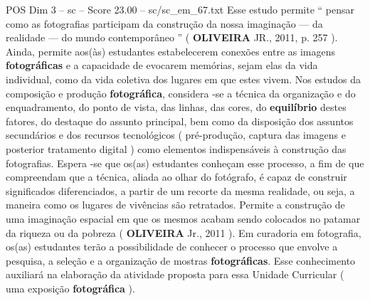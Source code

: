 \begin{textsample}{POS Dim 3 – sc – Score 23.00 – sc/sc\_em\_67.txt}
Esse estudo permite “ pensar como as fotografias participam da construção da nossa imaginação — da realidade — do mundo contemporâneo ” ( \textbf{OLIVEIRA} JR., 2011, p. 257 ).
Ainda, permite aos(às) estudantes estabelecerem conexões entre as imagens \textbf{fotográficas} e a capacidade de evocarem memórias, sejam elas da vida individual, como da vida coletiva dos lugares em que estes vivem.
Nos estudos da composição e produção \textbf{fotográfica}, considera -se a técnica da organização e do enquadramento, do ponto de vista, das linhas, das cores, do \textbf{equilíbrio} destes fatores, do destaque do assunto principal, bem como da disposição dos assuntos secundários e dos recursos tecnológicos ( pré-produção, captura das imagens e posterior tratamento digital ) como elementos indispensáveis à construção das fotografias.
Espera -se que os(as) estudantes conheçam esse processo, a fim de que compreendam que a técnica, aliada ao olhar do fotógrafo, é capaz de construir significados diferenciados, a partir de um recorte da mesma realidade, ou seja, a maneira como os lugares de vivências são retratados.
Permite a construção de uma imaginação espacial em que os mesmos acabam sendo colocados no patamar da riqueza ou da pobreza ( \textbf{OLIVEIRA} Jr., 2011 ).
Em curadoria em fotografia, os(as) estudantes terão a possibilidade de conhecer o processo que envolve a pesquisa, a seleção e a organização de mostras \textbf{fotográficas}.
Esse conhecimento auxiliará na elaboração da atividade proposta para essa Unidade Curricular ( uma exposição \textbf{fotográfica} ).

\end{textsample}
